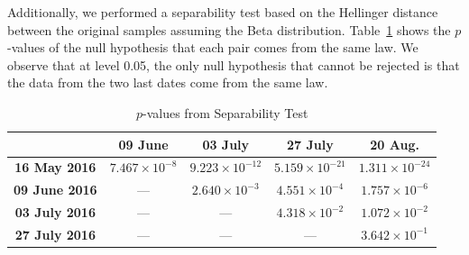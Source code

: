 \documentclass[12pt]{article}
\begin{document}
Additionally, we performed a separability test based on the Hellinger distance between the original samples assuming the Beta distribution.
Table~\ref{tab:pvalues_sep_alpha} shows the $p$-values of the null hypothesis that each pair comes from the same law.
We observe that at level \num{0.05}, the only null hypothesis that cannot be rejected is that the data from the two last dates come from the same law.

\begin{table}[hbt]
  \footnotesize
  \centering
  \caption{$p$-values from Separability Test}
  \label{tab:pvalues_sep_alpha}
  \begin{tabular}{ccccc}
  \toprule
& \textbf{09 June} & \textbf{03 July} & \textbf{27 July} & \textbf{20 Aug.}\\ \midrule
  \textbf{16 May 2016}  & $7.467 \times 10^{-8}$ & $9.223 \times 10^{-12}$ & $5.159 \times 10^{-21}$ & $1.311 \times 10^{-24}$ \\
  \textbf{09 June 2016}  & --- & $2.640 \times 10^{-3}$ & $4.551 \times 10^{-4}$ & $1.757 \times 10^{-6}$ \\
  \textbf{03 July 2016}  & --- & --- & $4.318 \times 10^{-2}$ & $1.072 \times 10^{-2}$\\
  \textbf{27 July 2016}  & --- & --- & --- & $3.642 \times 10^{-1}$ \\
  \bottomrule
  \end{tabular}
\end{table}
\end{document}
